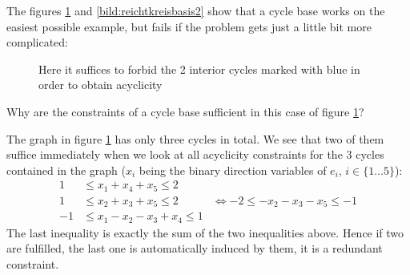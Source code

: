 The figures \ref{bild:reichtkreisbasis1} and \ref{bild:reichtkreisbasis2}
show that a cycle base works on the easiest possible example, but fails if the problem gets just a little bit more 
complicated:

\begin{figure}[h!]
\centering
{}
\caption{Here it suffices to forbid the 2 interior cycles marked with blue in order to obtain acyclicity}
\label{bild:reichtkreisbasis1}
\end{figure}

Why are the constraints of a cycle base sufficient in this case of figure \ref{bild:reichtkreisbasis1}? 

The graph in figure \ref{bild:reichtkreisbasis1} has only three cycles in total. We see that two of them 
suffice immediately when we look at all acyclicity constraints for the 3 cycles contained in the graph 
($x_i$ being the binary direction variables of $e_i$, $i\in\{1\dots 5\}$):
\begin{align*}
 1 &\le x_1+x_4+x_5\le 2&\\
 1&\le x_2+x_3+x_5\le 2& \iff -2\le -x_2-x_3-x_5\le -1\\
 -1 &\le x_1-x_2-x_3+x_4 \le 1&
\end{align*}
The last inequality is exactly the sum of the two inequalities above. Hence if two are fulfilled, the last one is 
automatically induced by them, it is a redundant constraint.

